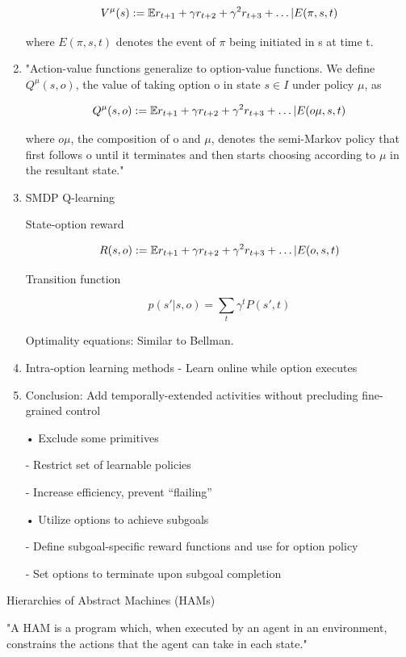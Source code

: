 \documentclass[english]{article}
\begin{document}
\begin{enumerate}
$$
V^\mu(s)
:= \mathbb{E} r_{t+1} +\gamma r_{t+2} +
\gamma^2 r_{t+3} 
+\ldots | E(\pi,s,t)$$ 

where $E(\pi,s,t)$ denotes the event of $\pi$ being initiated in s at time t.

\item "Action-value functions
generalize to option-value functions. We define $Q^\mu(s,o)$, the value of taking option o
in state $s \in I$ under policy $\mu$, as

$$
Q^\mu(s,o)
:= \mathbb{E} r_{t+1} +\gamma r_{t+2} +
\gamma^2 r_{t+3} 
+\ldots | E(o\mu,s,t)$$ 

where $o\mu$, the composition of o and $\mu$, denotes the semi-Markov policy that first follows
o until it terminates and then starts choosing according to $\mu$ in the resultant state." 



\item  SMDP Q-learning

State-option reward

$$
R(s,o)
:= \mathbb{E} r_{t+1} +\gamma r_{t+2} +
\gamma^2 r_{t+3} 
+\ldots | E(o,s,t)$$ 

Transition function

$$p(s'|s,o) 
= 
\sum_{t} \gamma^t 
P(s',t)$$

Optimality equations: Similar to Bellman.

\item Intra-option learning methods
- Learn online while option executes

\item  Conclusion: Add temporally-extended activities without
precluding fine-grained control

• Exclude some primitives

- Restrict set of learnable policies

- Increase efficiency, prevent “flailing”

• Utilize options to achieve subgoals

- Define subgoal-specific reward functions and use for
option policy

- Set options to terminate upon subgoal completion

\end{enumerate}

\item Hierarchies of Abstract Machines (HAMs)

\benum
\item 

"A HAM is a program which, when executed by an agent in an environment, constrains the
actions that the agent can take in each state."
\end{document}
